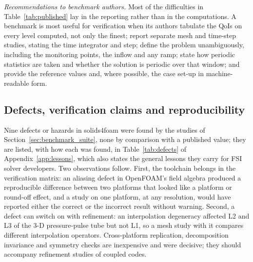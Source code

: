 \emph{Recommendations to benchmark authors.}
Most of the difficulties in Table~\ref{tab:published} lay in the reporting rather than in the computations.
A benchmark is most useful for verification when its authors tabulate the QoIs on every level computed, not only the finest; report separate mesh and time-step studies, stating the time integrator and step; define the problem unambiguously, including the monitoring points, the inflow and any ramp; state how periodic statistics are taken and whether the solution is periodic over that window; and provide the reference values and, where possible, the case set-up in machine-readable form.

\subsection{Defects, verification claims and reproducibility}\label{sec:defects}

Nine defects or hazards in solids4foam were found by the studies of Section~\ref{sec:benchmark_suite}, none by comparison with a published value; they are listed, with how each was found, in Table~\ref{tab:defects} of Appendix~\ref{app:lessons}, which also states the general lessons they carry for FSI solver developers.
Two observations follow.
First, the toolchain belongs in the verification matrix: an aliasing defect in OpenFOAM's field algebra produced a reproducible difference between two platforms that looked like a platform or round-off effect, and a study on one platform, at any resolution, would have reported either the correct or the incorrect result without warning.
Second, a defect can switch on with refinement: an interpolation degeneracy affected L2 and L3 of the 3-D pressure-pulse tube but not L1, so a mesh study with it compares different interpolation operators.
Cross-platform replication, decomposition invariance and symmetry checks are inexpensive and were decisive; they should accompany refinement studies of coupled codes.

